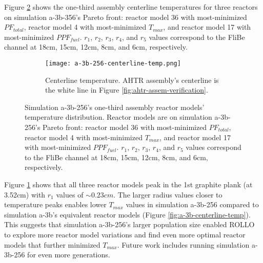 Figure \ref{fig:a-3b-256-temp-distribution} shows the one-third assembly centerline 
temperatures for three reactors on simulation a-3b-356's Pareto front: reactor model 36 
with most-minimized $PF_{total}$, reactor model 4 with most-minimized $T_{max}$, and
reactor model 17 with most-minimized $PPF_{fuel}$.
$r_1$, $r_2$, $r_3$, $r_4$, and $r_5$ values correspond to the FliBe channel at 18cm, 
15cm, 12cm, 8cm, and 6cm, respectively.  
\begin{figure}[htbp!]
    \begin{subfigure}{\textwidth}
        \centering
        \texttt{[image: a-3b-256-centerline-temp.png]}
        \caption{Centerline temperature. AHTR assembly's centerline is the white line 
        in Figure \ref{fig:ahtr-assem-verification}.}
        \label{fig:a-3b-256-centerline-temp} 
    \end{subfigure}
    \caption{Simulation a-3b-256's one-third assembly reactor models' temperature 
    distribution. Reactor models are on simulation a-3b-256's Pareto front: 
    reactor model 36 with most-minimized $PF_{total}$, 
    reactor model 4 with most-minimized $T_{max}$, and
    reactor model 17 with most-minimized $PPF_{fuel}$.
    $r_1$, $r_2$, $r_3$, $r_4$, and $r_5$ values correspond to the FliBe channel at 18cm, 
    15cm, 12cm, 8cm, and 6cm, respectively.  }
    \label{fig:a-3b-256-temp-distribution}
\end{figure}
Figure \ref{fig:a-3b-256-centerline-temp} shows that all three reactor models 
peak in the 1st graphite plank (at 3.52cm) with $r_1$ values of ${\sim}0.23cm$. 
The larger radius values closer to temperature peaks enables lower $T_{max}$ values
in simulation a-3b-256 compared to simulation a-3b's equivalent reactor models 
(Figure \ref{fig:a-3b-centerline-temp}). 
This suggests that simulation a-3b-256's larger population size enabled \gls{ROLLO} 
to explore more reactor model variations and find even more optimal reactor models 
that further minimized $T_{max}$. 
Future work includes running simulation a-3b-256 for even more generations. 